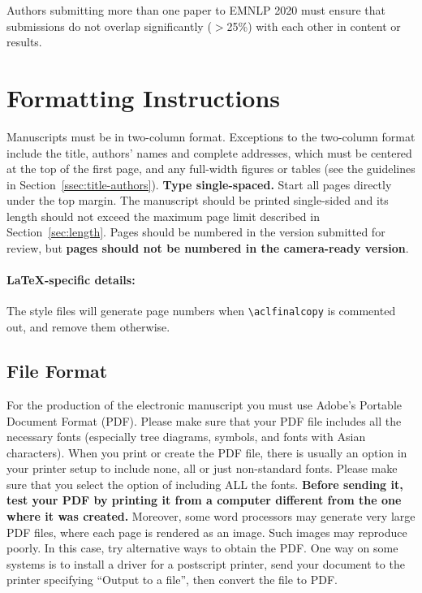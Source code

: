 \documentclass[11pt,a4paper]{article}
\begin{document}
Authors submitting more than one paper to EMNLP 2020 must ensure that submissions do not overlap significantly ($>$25\%) with each other in content or results.



\section{Formatting Instructions}

Manuscripts must be in two-column format.
Exceptions to the two-column format include the title, authors' names and complete addresses, which must be centered at the top of the first page, and any full-width figures or tables (see the guidelines in Section~\ref{ssec:title-authors}).
\textbf{Type single-spaced.}
Start all pages directly under the top margin.
The manuscript should be printed single-sided and its length should not exceed the maximum page limit described in Section~\ref{sec:length}.
Pages should be numbered in the version submitted for review, but \textbf{pages should not be numbered in the camera-ready version}.

\paragraph{\LaTeX-specific details:}
The style files will generate page numbers when {\small\verb|\aclfinalcopy|} is commented out, and remove them otherwise.


\subsection{File Format}
\label{sect:pdf}

For the production of the electronic manuscript you must use Adobe's Portable Document Format (PDF).
Please make sure that your PDF file includes all the necessary fonts (especially tree diagrams, symbols, and fonts with Asian characters).
When you print or create the PDF file, there is usually an option in your printer setup to include none, all or just non-standard fonts.
Please make sure that you select the option of including ALL the fonts.
\textbf{Before sending it, test your PDF by printing it from a computer different from the one where it was created.}
Moreover, some word processors may generate very large PDF files, where each page is rendered as an image.
Such images may reproduce poorly.
In this case, try alternative ways to obtain the PDF.
One way on some systems is to install a driver for a postscript printer, send your document to the printer specifying ``Output to a file'', then convert the file to PDF.
\end{document}
